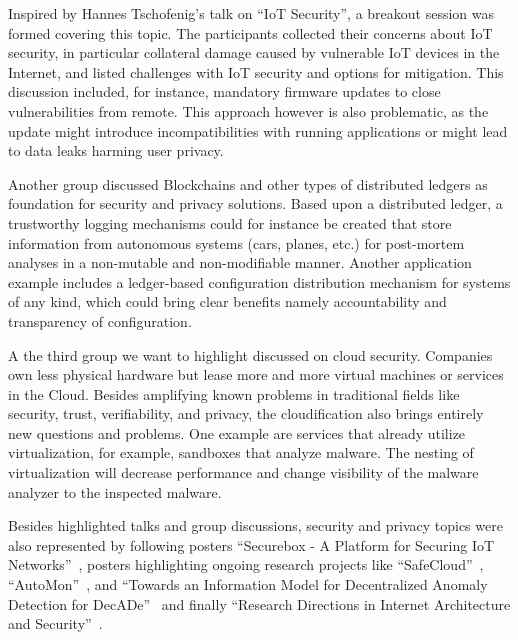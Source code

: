 
Inspired by Hannes Tschofenig's talk on ``IoT Security'', a breakout session was formed covering this topic. The participants collected their concerns about IoT security, in particular collateral damage caused by vulnerable IoT devices in the Internet, and listed challenges with IoT security and options for mitigation. This discussion included, for instance, mandatory firmware updates to close vulnerabilities from remote. This approach however is also problematic, as the update might introduce incompatibilities with running applications or might lead to data leaks harming user privacy.

Another group discussed Blockchains and other types of distributed ledgers as foundation for security and privacy solutions. Based upon a distributed ledger, a trustworthy logging mechanisms could for instance be created that store information from autonomous systems (cars, planes, etc.) for post-mortem analyses in a non-mutable and non-modifiable manner. Another application example includes a ledger-based configuration distribution mechanism for systems of any kind, which could bring clear benefits namely accountability and transparency of configuration.

A the third group we want to highlight discussed on cloud security. Companies own less physical hardware but lease  more and more virtual machines or services in the Cloud. Besides amplifying known problems in traditional fields like security, trust, verifiability, and privacy, the cloudification also brings entirely new questions and problems. One example are services that already utilize virtualization, for example, sandboxes that analyze malware. The nesting of virtualization will decrease performance and change visibility of the malware analyzer to the inspected malware.

Besides highlighted talks and group discussions, security and privacy topics were also represented by following posters
``Securebox - A Platform for Securing IoT Networks''~\cite{hafeez:s3:2015, hafeez:can:2016},
posters highlighting ongoing research projects like ``SafeCloud''~\cite{safecloud},
``AutoMon''~\cite{automon}, and
``Towards an Information Model for Decentralized Anomaly Detection for DecADe''~\cite{decade} and finally
``Research Directions in Internet Architecture and Security''~\cite{glra, mms, ipv6hitlist}.
